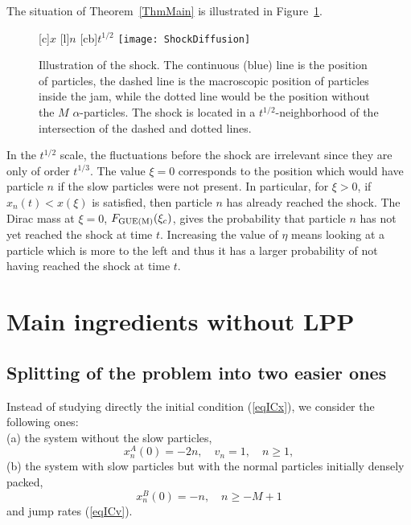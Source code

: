 \documentclass[12pt,a4paper]{article}
\numberwithin{equation}{section}
\begin{document}
The situation of Theorem~\ref{ThmMain} is illustrated in Figure~\ref{FigureShock}.
\begin{figure}[t]
\begin{center}
[c]{$x$}
[l]{$n$}
[cb]{$t^{1/2}$}
\texttt{[image: ShockDiffusion]}
\caption{Illustration of the shock. The continuous (blue) line is the position of particles, the dashed line is the macroscopic position of particles inside the jam, while the dotted line would be the position without the $M$ $\alpha$-particles. The shock is located in a $t^{1/2}$-neighborhood of the intersection of the dashed and dotted lines.}
\label{FigureShock}
\end{center}
\end{figure}
In the $t^{1/2}$ scale, the fluctuations before the shock are irrelevant since they are only of order $t^{1/3}$. The value $\xi=0$ corresponds to the position which would have particle $n$ if the slow particles were not present. In particular, for $\xi>0$, if $x_n(t)<x(\xi)$ is satisfied, then particle $n$ has already reached the shock. The Dirac mass at $\xi=0$, $F_{\rm GUE(M)}(\xi_c)$, gives the probability that particle $n$ has not yet reached the shock at time $t$. Increasing the value of $\eta$ means looking at a particle which is more to the left and thus it has a larger probability of not having reached the shock at time $t$.

\section{Main ingredients without LPP}

\subsection{Splitting of the problem into two easier ones}\label{SectSplitting}
Instead of studying directly the initial condition (\ref{eqICx}), we consider the following ones:\\
(a) the system without the slow particles,
\begin{equation}\label{eqICA}
x^A_n(0)=-2n, \quad v_n=1,\quad n\geq 1,
\end{equation}
(b) the system with slow particles but with the normal particles initially densely packed,
\begin{equation}\label{eqICB}
x^B_n(0)=-n, \quad n\geq -M+1
\end{equation}
and jump rates (\ref{eqICv}).
\end{document}
